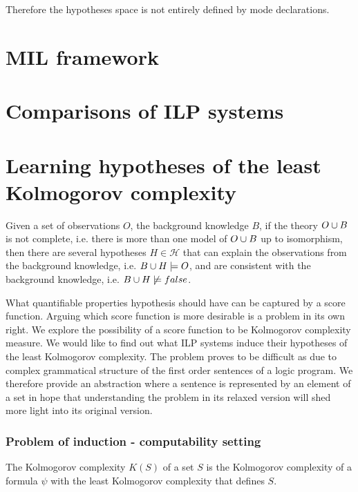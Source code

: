 Therefore the hypotheses space is not entirely defined by mode declarations.

\subsection{}

\chapter{MIL framework}

\chapter{Comparisons of ILP systems}

\chapter{Learning hypotheses of the least Kolmogorov complexity}

Given a set of observations $O$, the background knowledge $B$, if the theory $O \cup B$ is not complete, i.e. there is more than one model of $O \cup B$ up to isomorphism, then there are several hypotheses $H \in \mathcal{H}$ that can explain the observations from the background knowledge, i.e. $B \cup H \models O$, and are consistent with the background knowledge, i.e. $B \cup H \not\models false$.

What quantifiable properties hypothesis should have can be captured by a score function. Arguing which score function is more desirable is a problem in its own right. We explore the possibility of a score function to be Kolmogorov complexity measure. We would like to find out what ILP systems induce their hypotheses of the least Kolmogorov complexity. The problem proves to be difficult as due to complex grammatical structure of the first order sentences of a logic program. We therefore provide an abstraction where a sentence is represented by an element of a set in hope that understanding the problem in its relaxed version will shed more light into its original version.

\subsection{Problem of induction - computability setting}

\begin{defn}
The Kolmogorov complexity $K(S)$ of a set $S$ is the Kolmogorov complexity
of a formula $\psi$ with the least Kolmogorov complexity that defines $S$.
\end{defn}

